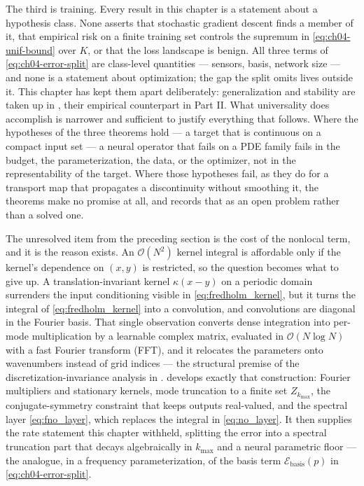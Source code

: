 The third is training. Every result in this chapter is a statement about a hypothesis class. None asserts that stochastic gradient descent finds a member of it, that empirical risk on a finite training set controls the supremum in \eqref{eq:ch04-unif-bound} over $K$, or that the loss landscape is benign. All three terms of \eqref{eq:ch04-error-split} are class-level quantities --- sensors, basis, network size --- and none is a statement about optimization; the gap the split omits lives outside it. This chapter has kept them apart deliberately: generalization and stability are taken up in , their empirical counterpart in Part II. What universality does accomplish is narrower and sufficient to justify everything that follows. Where the hypotheses of the three theorems hold --- a target that is continuous on a compact input set --- a neural operator that fails on a PDE family fails in the budget, the parameterization, the data, or the optimizer, not in the representability of the target. Where those hypotheses fail, as they do for a transport map that propagates a discontinuity without smoothing it, the theorems make no promise at all, and  records that as an open problem rather than a solved one.


The unresolved item from the preceding section is the cost of the nonlocal term, and it is the reason  exists. An $\mathcal{O}(N^{2})$ kernel integral is affordable only if the kernel's dependence on $(x,y)$ is restricted, so the question becomes what to give up. A translation-invariant kernel $\kappa(x-y)$ on a periodic domain surrenders the input conditioning visible in \eqref{eq:fredholm_kernel}, but it turns the integral of \eqref{eq:fredholm_kernel} into a convolution, and convolutions are diagonal in the Fourier basis. That single observation converts dense integration into per-mode multiplication by a learnable complex matrix, evaluated in $\mathcal{O}(N\log N)$ with a fast Fourier transform (FFT), and it relocates the parameters onto wavenumbers instead of grid indices --- the structural premise of the discretization-invariance analysis in .  develops exactly that construction: Fourier multipliers and stationary kernels, mode truncation to a finite set $Z_{k_{\max}}$, the conjugate-symmetry constraint that keeps outputs real-valued, and the spectral layer \eqref{eq:fno_layer}, which replaces the integral in \eqref{eq:no_layer}. It then supplies the rate statement this chapter withheld, splitting the error into a spectral truncation part that decays algebraically in $k_{\max}$ and a neural parametric floor --- the analogue, in a frequency parameterization, of the basis term $\mathcal{E}_{\text{basis}}(p)$ in \eqref{eq:ch04-error-split}.
